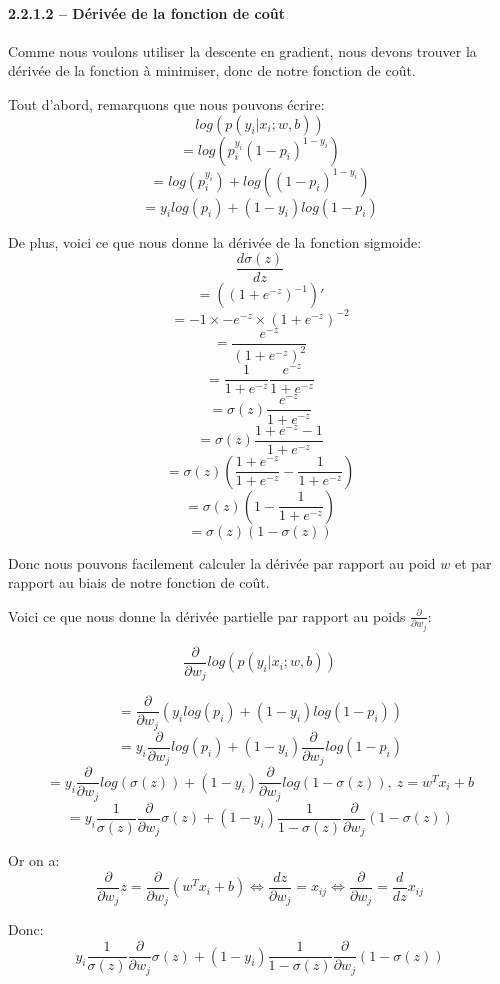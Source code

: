 \documentclass[
]{article}
\begin{document}
\hypertarget{duxe9rivuxe9e-de-la-fonction-de-couxfbt}{%
\paragraph{2.2.1.2 -- Dérivée de la fonction de
coût}\label{duxe9rivuxe9e-de-la-fonction-de-couxfbt}}

Comme nous voulons utiliser la descente en gradient, nous devons trouver
la dérivée de la fonction à minimiser, donc de notre fonction de coût.

Tout d'abord, remarquons que nous pouvons écrire:
\[log(p(y_i|x_i; w, b))\] \[= log(p_i^{y_i}(1 - p_i)^{1 - y_i})\]
\[= log(p_i^{y_i}) + log((1 - p_i)^{1 - y_i})\]
\[= y_i log(p_i) + (1 - y_i)log(1 - p_i)\]

De plus, voici ce que nous donne la dérivée de la fonction sigmoide:
\[\frac{d\sigma(z)}{dz}\] \[= ((1 + e^{-z})^{-1})'\]
\[= -1 \times - e ^{-z} \times (1 + e^{-z})^{-2}\]
\[=\frac{e^{-z}}{(1 + e^{-z})^2}\]
\[=\frac{1}{1 + e^{-z}}\frac{e^{-z}}{1 + e^{-z}}\]
\[= \sigma (z) \frac{e^{-z}}{1 + e^{-z}}\]
\[= \sigma (z) \frac{1 + e^{-z} - 1}{1 + e^{-z}}\]
\[= \sigma (z) (\frac{1 + e^{-z}}{1 + e^{-z}} - \frac{1}{1 + e^{-z}})\]
\[= \sigma (z) (1 - \frac{1}{1 + e^{-z}})\]
\[= \sigma (z) (1 - \sigma (z))\]

Donc nous pouvons facilement calculer la dérivée par rapport au poid
\(w\) et par rapport au biais de notre fonction de coût.

Voici ce que nous donne la dérivée partielle par rapport au poids
\(\frac{\partial}{\partial w_j}\):

\[\frac{\partial}{\partial w_j}log(p(y_i|x_i;w,b))\]

\[=\frac{\partial}{\partial w_j} (y_i log(p_i) + (1 - y_i)log(1 - p_i))\]
\[=y_i \frac{\partial}{\partial w_j}log(p_i) + (1 - y_i)\frac{\partial}{\partial w_j}log(1 - p_i)\]
\[=y_i \frac{\partial}{\partial w_j}log(\sigma (z)) + (1 - y_i)\frac{\partial}{\partial w_j}log(1 - \sigma (z)),\ z = w^T x_i + b\]
\[=y_i \frac{1}{\sigma (z)}\frac{\partial}{\partial w_j}\sigma (z) + (1 - y_i)\frac{1}{1 - \sigma (z)}\frac{\partial}{\partial w_j}(1 - \sigma (z))\]

Or on a:
\[\frac{\partial}{\partial w_j} z = \frac{\partial}{\partial w_j}(w^T x_i + b) \Leftrightarrow \frac{dz}{\partial w_j} = x_{ij} \Leftrightarrow \frac{\partial}{\partial w_j} = \frac{d}{dz}x_{ij}\]

Donc:
\[y_i \frac{1}{\sigma (z)}\frac{\partial}{\partial w_j}\sigma (z) + (1 - y_i)\frac{1}{1 - \sigma (z)}\frac{\partial}{\partial w_j}(1 - \sigma (z))\]
\end{document}
